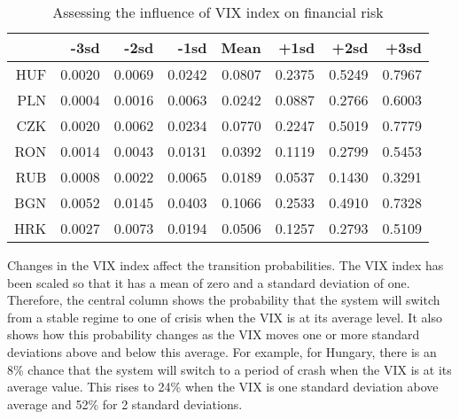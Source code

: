 \documentclass[12pt, a4paper, oneside]{article}\usepackage[]{graphicx}\usepackage[]{color}
\begin{document}
\begin{table}[t]
\begin{threeparttable}
\centering
\begin{tabular}{rrrrrrrr}
  \hline
 & -3sd & -2sd & -1sd & Mean & +1sd & +2sd & +3sd \\ 
  \hline
  HUF & 0.0020 & 0.0069 & 0.0242 & 0.0807 & 0.2375 & 0.5249 & 0.7967 \\ 
  PLN & 0.0004 & 0.0016 & 0.0063 & 0.0242 & 0.0887 & 0.2766 & 0.6003 \\ 
  CZK & 0.0020 & 0.0062 & 0.0234 & 0.0770 & 0.2247 & 0.5019 & 0.7779 \\ 
  RON & 0.0014 & 0.0043 & 0.0131 & 0.0392 & 0.1119 & 0.2799 & 0.5453 \\ 
  RUB & 0.0008 & 0.0022 & 0.0065 & 0.0189 & 0.0537 & 0.1430 & 0.3291 \\
  BGN & 0.0052 & 0.0145 & 0.0403 & 0.1066 & 0.2533 & 0.4910 & 0.7328 \\ 
  HRK & 0.0027 & 0.0073 & 0.0194 & 0.0506 & 0.1257 & 0.2793 & 0.5109 \\ 
   \hline
\end{tabular}
\begin{tablenotes}
\small
\item Changes in the VIX index affect the transition probabilities.  The VIX index has been scaled so that it has a mean of zero and a standard deviation of one.  Therefore, the central column shows the probability that the system will switch from a stable regime to one of crisis when the VIX is at its average level.  It also shows how this probability changes as the VIX moves one or more standard deviations above and below this average. For example, for Hungary, there is an 8\% chance that the system will switch to a period of crash when the VIX is at its average value.  This rises to 24\% when the VIX is one standard deviation above average and 52\% for 2 standard deviations.  
\end{tablenotes}
\caption{Assessing the influence of VIX index on financial risk} 
\label{tabref:vixtranprob}
\end{threeparttable}
\end{table}
\end{document}
